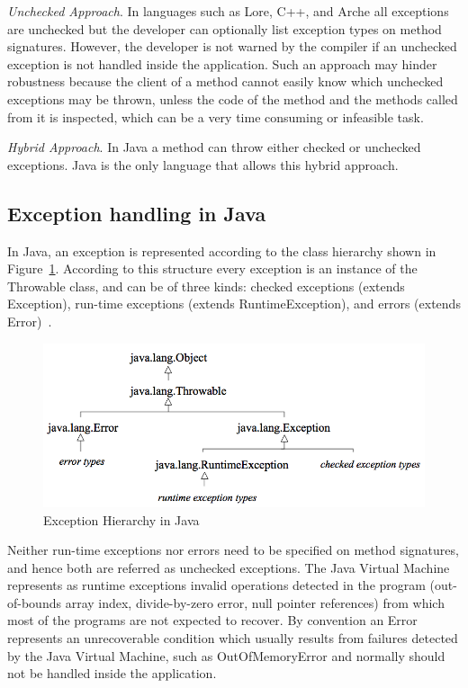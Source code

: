 \documentclass[conference]{IEEEtran}
\begin{document}
\noindent\emph{Unchecked Approach}. In languages such as Lore, C++, and Arche
all exceptions are unchecked but the developer can optionally list exception
types on method signatures. However, the developer is not warned by the compiler
if an unchecked exception is not handled inside the application. Such an
approach may hinder robustness because the client of a method cannot easily know
which unchecked exceptions may be thrown, unless the code of the method and the
methods called from it is inspected, which can be a very time consuming or
infeasible task.



\noindent\emph{Hybrid Approach}. In Java a method can throw either checked or
unchecked exceptions. Java is the only language that allows this hybrid
approach.

\subsection{Exception handling in Java} \label{sec:extypes}

In Java, an exception is represented according to the class hierarchy shown in
Figure~\ref{fig:exchier}.  According to this structure every exception is an
instance of the Throwable class, and can be of three kinds: checked exceptions
(extends Exception), run-time exceptions (extends RuntimeException), and errors
(extends Error)~\cite{gosling2000java}.

\begin{figure} \centering \includegraphics[width=\hsize]{new2_hierarchy.png}
  \caption{Exception Hierarchy in Java} \label{fig:exchier} \end{figure}

Neither run-time exceptions nor errors need to be specified on method
signatures, and hence both are referred as unchecked exceptions. The Java
Virtual Machine represents as runtime exceptions invalid operations detected in
the program (out-of-bounds array index, divide-by-zero error, null pointer
references) from which most of the programs are not expected to recover. By
convention an Error represents an unrecoverable condition which usually results
from failures detected by the Java Virtual Machine, such as OutOfMemoryError and
normally should not be handled inside the application.
\end{document}
